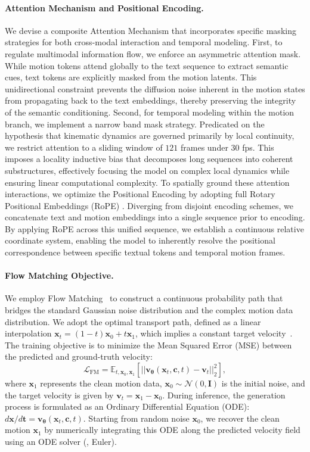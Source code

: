 \paragraph{Attention Mechanism and Positional Encoding.}
We devise a composite Attention Mechanism that incorporates specific masking strategies for both cross-modal interaction and temporal modeling.
First, to regulate multimodal information flow, we enforce an asymmetric attention mask.
While motion tokens attend globally to the text sequence to extract semantic cues, text tokens are explicitly masked from the motion latents.
This unidirectional constraint prevents the diffusion noise inherent in the motion states from propagating back to the text embeddings, thereby preserving the integrity of the semantic conditioning.
Second, for temporal modeling within the motion branch, we implement a narrow band mask strategy.
Predicated on the hypothesis that kinematic dynamics are governed primarily by local continuity, we restrict attention to a sliding window of $121$ frames under $30$ fps.
This imposes a locality inductive bias that decomposes long sequences into coherent substructures, effectively focusing the model on complex local dynamics while ensuring linear computational complexity.
To spatially ground these attention interactions, we optimize the Positional Encoding by adopting full Rotary Positional Embeddings (RoPE) \cite{su2024roformer}.
Diverging from disjoint encoding schemes, we concatenate text and motion embeddings into a single sequence prior to encoding.
By applying RoPE across this unified sequence, we establish a continuous relative coordinate system, enabling the model to inherently resolve the positional correspondence between specific textual tokens and temporal motion frames.

\paragraph{Flow Matching Objective.}
We employ Flow Matching~\citep{Lipman2022} to construct a continuous probability path that bridges the standard Gaussian noise distribution and the complex motion data distribution.
We adopt the optimal transport path, defined as a linear interpolation $\bm{x}_t=(1-t)\bm{x}_0 + t\bm{x}_1$, which implies a constant target velocity~\citep{Liu2022}.
The training objective is to minimize the Mean Squared Error (MSE) between the predicted and ground-truth velocity:
\begin{equation}
    \mathcal{L}_{\text{FM}} = \mathbb{E}_{t, \bm{x}_0, \bm{x}_1} [ || \bm{v}_{\bm{\theta}}(\bm{x}_t,\bm{c},t) - \bm{v}_t ||^2_2 ],
    \label{eq:flow_matching}
\end{equation}
where $\bm{x}_1$ represents the clean motion data, $\bm{x}_0\sim\mathcal{N}(0, \bm{I})$ is the initial noise, and the target velocity is given by $\bm{v}_t=\bm{x}_1-\bm{x}_0$.
During inference, the generation process is formulated as an Ordinary Differential Equation (ODE): $d\bm{x}/d\bm{t}=\bm{v}_{\bm{\theta}}(\bm{x}_t,\bm{c},t)$.
Starting from random noise $\bm{x}_0$, we recover the clean motion $\bm{x}_1$ by numerically integrating this ODE along the predicted velocity field using an ODE solver (\eg, Euler).


